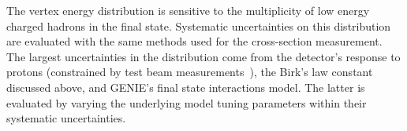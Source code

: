 

The vertex energy distribution is sensitive to the multiplicity of low energy charged hadrons in the final state. 
Systematic uncertainties on this distribution are evaluated with the same methods 
used for the cross-section measurement.  The largest uncertainties in the
distribution come from the detector's response to protons (constrained by test beam measurements~\cite{minerva_nim}), the Birk's law constant discussed above, and GENIE's final state interactions model.  The latter is evaluated by varying the underlying model tuning parameters within their systematic uncertainties.
